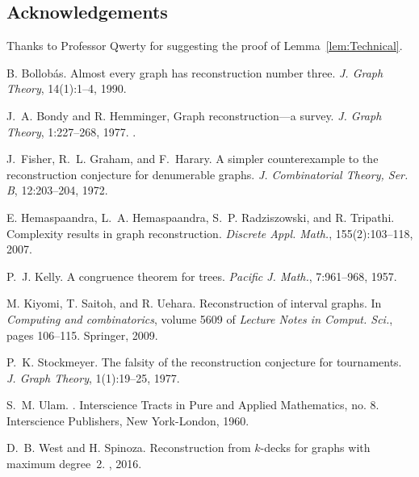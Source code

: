 \documentclass[12pt]{article}
\begin{document}
\subsection*{Acknowledgements}

Thanks to Professor Qwerty for suggesting the proof of
Lemma~\ref{lem:Technical}.


\begin{thebibliography}{99}

 B. Bollob{\'a}s. \newblock Almost every
  graph has reconstruction number three. \newblock \emph{J. Graph Theory},
  14(1):1--4, 1990.

 J.~A. Bondy and R. Hemminger,
\newblock Graph reconstruction---a survey.
\emph{J. Graph Theory}, 1:227--268, 1977. .

 J.~Fisher, R.~L. Graham, and F.~Harary. \newblock A
  simpler counterexample to the reconstruction conjecture for
  denumerable graphs. \newblock \emph{J. Combinatorial Theory, Ser. B},
  12:203--204, 1972.

 E. Hemaspaandra, L.~A. Hemaspaandra,
  S.~P. Radziszowski, and R. Tripathi. \newblock
  Complexity results in graph reconstruction. \newblock \emph{Discrete
    Appl. Math.}, 155(2):103--118, 2007.

 P.~J. Kelly. \newblock A congruence theorem for
  trees. \newblock \emph{Pacific J. Math.}, 7:961--968, 1957.

 M. Kiyomi, T. Saitoh, and R. Uehara.
  \newblock Reconstruction of interval graphs. \newblock In 
    \emph{Computing and combinatorics}, volume 5609 of
    \emph{Lecture Notes in Comput. Sci.}, pages 106--115. Springer, 2009.

 P.~K. Stockmeyer. \newblock The falsity of the
  reconstruction conjecture for tournaments. \newblock \emph{J. Graph
    Theory}, 1(1):19--25, 1977.

 S.~M. Ulam. \newblock {}. \newblock Interscience Tracts in Pure and
  Applied Mathematics, no. 8.  Interscience Publishers, New
  York-London, 1960.
  
 D.~B. West and H. Spinoza.
 \newblock Reconstruction from $k$-decks for graphs with maximum degree~2.
 \newblock {}, 2016.

\end{thebibliography}
\end{document}
